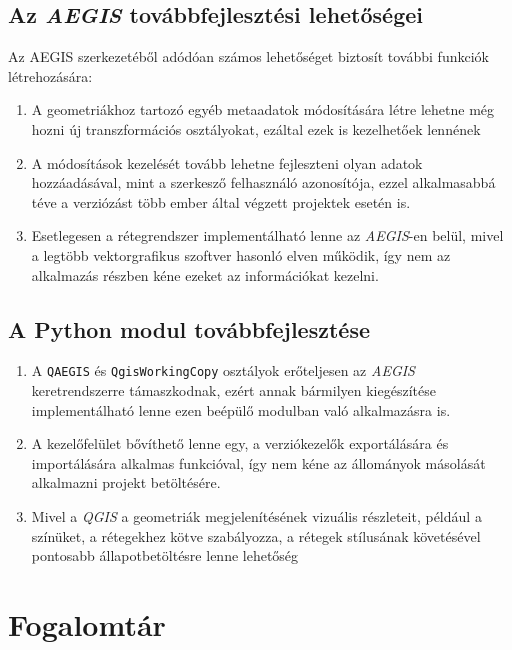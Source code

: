\subsection{Az \emph{AEGIS} továbbfejlesztési lehetőségei}
Az AEGIS szerkezetéből adódóan számos lehetőséget biztosít további funkciók létrehozására:
\begin{enumerate}
	\item A geometriákhoz tartozó egyéb metaadatok módosítására létre lehetne még hozni új transzformációs osztályokat, ezáltal ezek is kezelhetőek lennének
	\item A módosítások kezelését tovább lehetne fejleszteni olyan adatok hozzáadásával, mint a szerkesző felhasználó azonosítója, ezzel alkalmasabbá téve a verziózást több ember által végzett projektek esetén is.
	\item Esetlegesen a rétegrendszer implementálható lenne az \emph{AEGIS}-en belül, mivel a legtöbb vektorgrafikus szoftver hasonló elven működik, így nem az alkalmazás részben kéne ezeket az információkat kezelni.
\end{enumerate}
\subsection{A Python modul továbbfejlesztése}
\begin{enumerate}
	\item A \texttt{QAEGIS} és \texttt{QgisWorkingCopy} osztályok erőteljesen az \emph{AEGIS} keretrendszerre támaszkodnak, ezért annak bármilyen kiegészítése implementálható lenne ezen beépülő modulban való alkalmazásra is.
	\item A kezelőfelület bővíthető lenne egy, a verziókezelők exportálására és importálására alkalmas funkcióval, így nem kéne az állományok másolását alkalmazni projekt betöltésére.
	\item Mivel a \emph{QGIS} a geometriák megjelenítésének vizuális részleteit, például a színüket, a rétegekhez kötve szabályozza, a rétegek stílusának követésével pontosabb állapotbetöltésre lenne lehetőség
\end{enumerate}

\section{Fogalomtár}
\label{sec:definitions}

